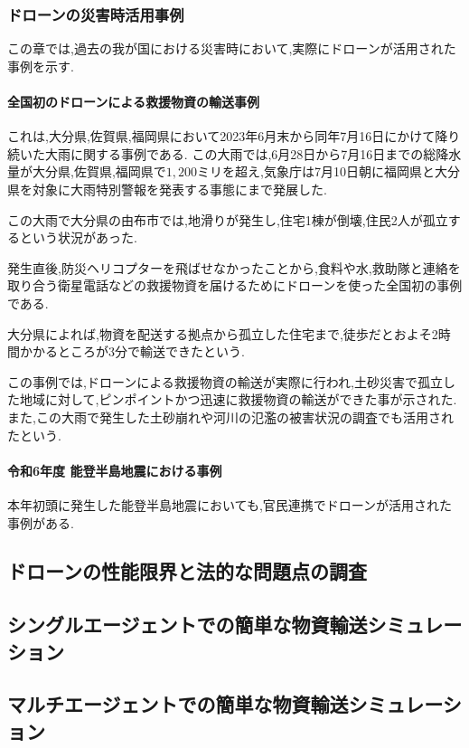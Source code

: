 \documentclass{article}[jsarticle]
\begin{document}
\subsubsection{ドローンの災害時活用事例}
この章では,過去の我が国における災害時において,実際にドローンが活用された事例を示す.
\paragraph{全国初のドローンによる救援物資の輸送事例}
これは,大分県,佐賀県,福岡県において2023年6月末から同年7月16日にかけて降り続いた大雨に関する事例である.
この大雨では,6月28日から7月16日までの総降水量が大分県,佐賀県,福岡県で$1,200$ミリを超え,気象庁は7月10日朝に福岡県と大分県を対象に大雨特別警報を発表する事態にまで発展した.\par
この大雨で大分県の由布市では,地滑りが発生し,住宅1棟が倒壊,住民2人が孤立するという状況があった.\par 
発生直後,防災ヘリコプターを飛ばせなかったことから,食料や水,救助隊と連絡を取り合う衛星電話などの救援物資を届けるためにドローンを使った全国初の事例である.\par 
大分県によれば,物資を配送する拠点から孤立した住宅まで,徒歩だとおよそ2時間かかるところが3分で輸送できたという.\par
この事例では,ドローンによる救援物資の輸送が実際に行われ,土砂災害で孤立した地域に対して,ピンポイントかつ迅速に救援物資の輸送ができた事が示された.
また,この大雨で発生した土砂崩れや河川の氾濫の被害状況の調査でも活用されたという.

\paragraph{令和6年度 能登半島地震における事例}
本年初頭に発生した能登半島地震においても,官民連携でドローンが活用された事例がある.\par 



\subsection{ドローンの性能限界と法的な問題点の調査}
\subsection{シングルエージェントでの簡単な物資輸送シミュレーション}
\subsection{マルチエージェントでの簡単な物資輸送シミュレーション}
\end{document}
